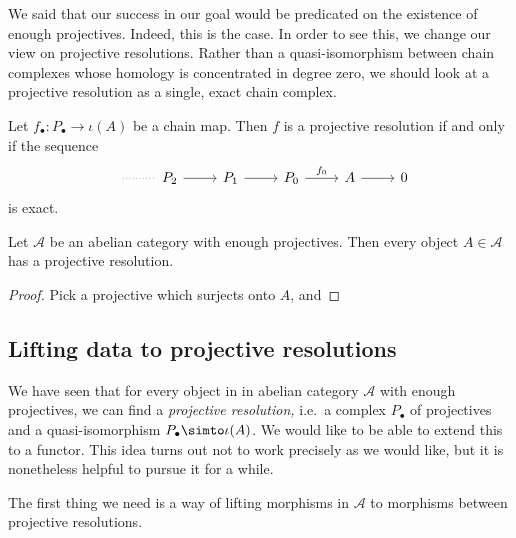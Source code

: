 \documentclass[main.tex]{subfiles}
\begin{document}
We said that our success in our goal would be predicated on the existence of enough projectives. Indeed, this is the case. In order to see this, we change our view on projective resolutions. Rather than a quasi-isomorphism between chain complexes whose homology is concentrated in degree zero, we should look at a projective resolution as a single, exact chain complex.

\begin{lemma}
  \label{lemma:equivalent_characterization_of_projective_resolution}
  Let $f_{\bullet}\colon P_{\bullet} \to \iota(A)$ be a chain map. Then $f$ is a projective resolution if and only if the sequence
  \begin{equation*}
    \begin{tikzcd}
      \
      \arrow[r, dotted, no head]
      & P_{2}
      \arrow[r]
      & P_{1}
      \arrow[r]
      & P_{0}
      \arrow[r, "f_{0}"]
      & A
      \arrow[r]
      & 0
    \end{tikzcd}
  \end{equation*}
  is exact.
\end{lemma}

\begin{proposition}
  Let $\mathcal{A}$ be an abelian category with enough projectives. Then every object $A \in \mathcal{A}$ has a projective resolution.
\end{proposition}
\begin{proof}
  Pick a projective which surjects onto $A$, and
\end{proof}

\subsection{Lifting data to projective resolutions}
\label{ssc:lifting_data_to_projective_resolutions}

We have seen that for every object in in abelian category $\mathcal{A}$ with enough projectives, we can find a \emph{projective resolution,} i.e.\ a complex $P_{\bullet}$ of projectives and a quasi-isomorphism $P_{\bullet} \simto \iota(A)$. We would like to be able to extend this to a functor. This idea turns out not to work precisely as we would like, but it is nonetheless helpful to pursue it for a while.

The first thing we need is a way of lifting morphisms in $\mathcal{A}$ to morphisms between projective resolutions.
\end{document}

